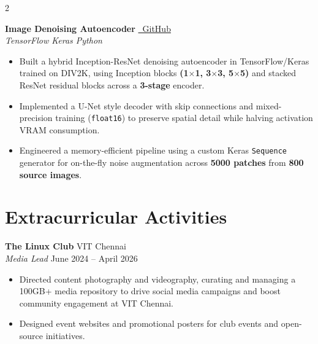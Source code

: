 \documentclass[10pt, a4paper]{article}
\newcommand{\entry}[4]{%
  \vspace{2pt}
  {\bfseries\color{bodytext} #1}\hfill{\small\color{lightgray} #3}\\
  {\small\itshape\color{accent} #2}\hfill{\small\color{lightgray} #4}
  \vspace{2pt}
}
\newenvironment{bullets}{%
  \begin{itemize}[leftmargin=1.1em, itemsep=1pt, topsep=2pt, parsep=0pt]
  \small\color{bodytext}
}{\end{itemize}}
\begin{document}
\begin{paracol}{2}
\begin{rightcolumn}
\begin{minipage}[t]{\dimexpr\linewidth-20pt}
\entry{Image Denoising Autoencoder}%
      {TensorFlow \textbullet{} Keras \textbullet{} Python}%
      {\href{https://github.com/kaezrr/image-denoiser-scaler}{\faIcon{github}~GitHub}}%
      {}
\begin{bullets}
  \item Built a hybrid Inception-ResNet denoising autoencoder in TensorFlow/Keras trained on DIV2K, using Inception blocks \textbf{(1$\times$1, 3$\times$3, 5$\times$5)} and stacked ResNet residual blocks across a \textbf{3-stage} encoder.
  \item Implemented a U-Net style decoder with skip connections and mixed-precision training (\texttt{float16}) to preserve spatial detail while halving activation VRAM consumption.
  \item Engineered a memory-efficient pipeline using a custom Keras \texttt{Sequence} generator for on-the-fly noise augmentation across \textbf{5000 patches} from \textbf{800 source images}.
\end{bullets}


\vspace{4pt}


\section{Extracurricular Activities}

\entry{The Linux Club}{Media Lead}{VIT Chennai}{June 2024 -- April 2026}
\begin{bullets}
  \item Directed content photography and videography, curating and managing a 100GB+ media repository to drive social media campaigns and boost community engagement at VIT Chennai.
  \item Designed event websites and promotional posters for club events and open-source initiatives.
\end{bullets}


\end{minipage}
\end{rightcolumn}
\end{paracol}
\end{document}
